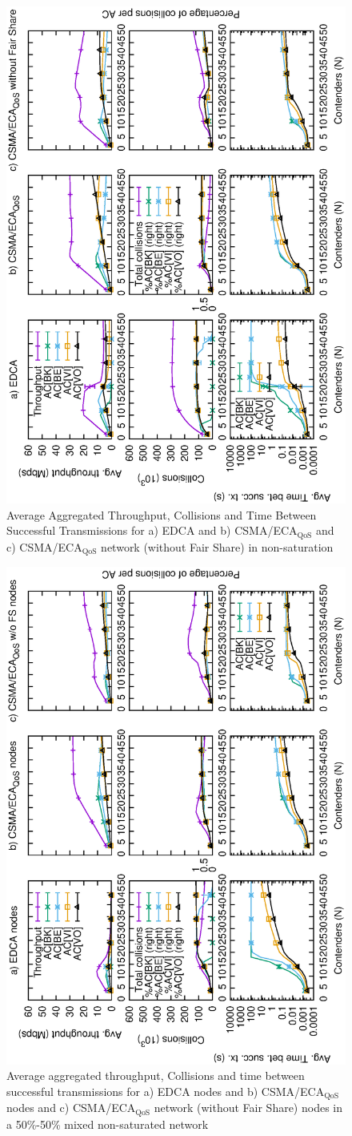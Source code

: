 \begin{figure}[tb]
	\centering
		\includegraphics[width=0.55\linewidth,angle = -90]{figures/multiplot-unsat-error-0-1.eps}
		\caption{Average Aggregated Throughput, Collisions and Time Between Successful Transmissions for a) EDCA and b) CSMA/ECA$_{\text{QoS}}$ and c) CSMA/ECA$_{\text{QoS}}$ network (without Fair Share) in non-saturation}
		\label{fig:multiplotUnsat}
\end{figure}
	
\begin{figure}[t]
	\centering
		\includegraphics[width=0.55\linewidth,angle = -90]{figures/multiplot-combined-unsat-error-0-1.eps}
		\caption{Average aggregated throughput, Collisions and time between successful transmissions for a) EDCA nodes and b) CSMA/ECA$_{\text{QoS}}$ nodes and c) CSMA/ECA$_{\text{QoS}}$ network (without Fair Share) nodes in a 50\%-50\% mixed non-saturated network}
		\label{fig:multiplotCombinedUnsat}
\end{figure}

